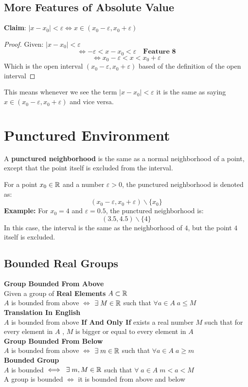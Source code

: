 \subsection{More Features of Absolute Value}
\textbf{Claim}: $|x-x_0|<\varepsilon \iff x\in (x_0-\varepsilon,x_0+\varepsilon)$\\
\begin{proof}
    Given: $|x-x_0|<\varepsilon$
    \[ 
        \iff -\varepsilon < x-x_0 <\varepsilon \quad\textbf{Feature 8} 
    \]
    \[
        \iff x_0-\varepsilon < x <x_0+\varepsilon
    \]
    Which is the open interval $(x_0-\varepsilon,x_0+\varepsilon)$ based of the definition of the open interval
\end{proof}
This means whenever we see the term $|x-x_0|<\varepsilon$ it is the same as saying $x\in (x_0-\varepsilon,x_0+\varepsilon)$ and vice versa.\\

\section{Punctured Environment}

A \textbf{punctured neighborhood} is the same as a normal neighborhood of a point, except that the point itself is excluded from the interval.

\noindent For a point \( x_0 \in \mathbb{R} \) and a number \( \varepsilon > 0 \), the punctured neighborhood is denoted as:
\[
(x_0 - \varepsilon, x_0 + \varepsilon) \backslash \{x_0\}
\]
\textbf{Example:}  
For \( x_0 = 4 \) and \( \varepsilon = 0.5 \), the punctured neighborhood is:
\[
(3.5, 4.5) \backslash \{4\}
\]
In this case, the interval is the same as the neighborhood of $4$, but the point $4$ itself is excluded.

\subsection{Bounded Real Groups}
\textbf{Group Bounded From Above}\\
Given a group of \textbf{Real Elements} $A\subset \mathbb{R}$\\
$A$ is bounded from above $\iff$ $\exists\; M\in \mathbb{R}$ such that $\forall a\in A\;  a\leq M$\\
\textbf{Translation In English}\\
$A$ is bounded from above \textbf{If And Only If} exists a real number $M$ such that for every element in $A$ , $M$ is bigger or equal to every element in $A$\\
\textbf{Group Bounded From Below}\\
$A$ is bounded from above $\iff$ $\exists\; m\in \mathbb{R}$ such that $\forall a\in A\;  a\geq m$\\
\textbf{Bounded Group}\\
$A$ is bounded $\iff\; \exists \; m,M \in \mathbb{R}$ such that $\forall \; a\in A \; m<a<M$\\
A group is bounded $\iff$ it is bounded from above and below\\

